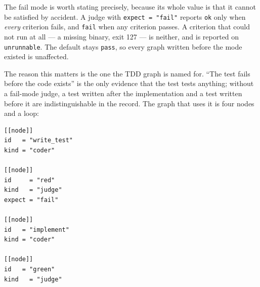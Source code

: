 \begin{center}
\end{center}

The fail mode is worth stating precisely, because its whole value is that it cannot be satisfied by
accident. A judge with \texttt{expect = "fail"} reports \texttt{ok} only when \emph{every} criterion
fails, and \texttt{fail} when any criterion passes. A criterion that could not run at all --- a
missing binary, exit 127 --- is neither, and is reported on \texttt{unrunnable}. The default stays
\texttt{pass}, so every graph written before the mode existed is unaffected.

The reason this matters is the one the TDD graph is named for. \enquote{The test fails before the
code exists} is the only evidence that the test tests anything; without a fail-mode judge, a test
written after the implementation and a test written before it are indistinguishable in the record.
The graph that uses it is four nodes and a loop:

\begin{lstlisting}
[[node]]
id   = "write_test"
kind = "coder"

[[node]]
id     = "red"
kind   = "judge"
expect = "fail"

[[node]]
id   = "implement"
kind = "coder"

[[node]]
id   = "green"
kind   = "judge"
\end{lstlisting}

